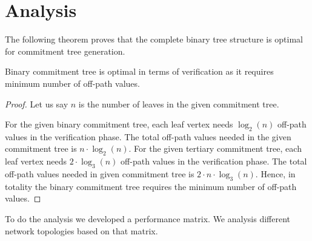 \chapter{Analysis}

	
	The following theorem proves that the complete binary tree structure is optimal for commitment tree generation.
	\begin{theorem}
		\label{Commitment tree}
		Binary commitment tree is optimal in terms of verification as it requires minimum number of off-path values.
	\end{theorem}

	\begin{proof}
		Let us say $n$ is the number of leaves in the given commitment tree.

			







		For the given binary commitment tree, each leaf vertex needs $\log_{2}(n)$ off-path values in the verification phase.
		The total off-path values needed in the given commitment tree is $n \cdot \log_{2}(n)$.
		For the given tertiary commitment tree, each leaf vertex needs $2 \cdot \log_{3}(n)$ off-path values in the verification phase.
		The total off-path values needed in given commitment tree is $2 \cdot n \cdot \log_{3}(n)$.
		Hence, in totality the binary commitment tree requires the minimum number of off-path values.
	\end{proof}

	To do the analysis we developed a performance matrix. 
	We analysis different network topologies based on that matrix.

